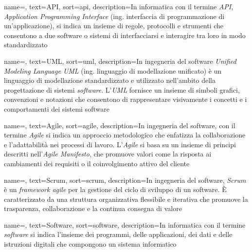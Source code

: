 

 {
    name=,
    text=API,
    sort=api,
    description={In informatica con il termine \emph{API}, \emph{Application Programming Interface} (ing. interfaccia di programmazione di un'applicazione), si indica
    un insieme di regole, protocolli e strumenti che consentono a due software o sistemi di interfacciarsi e interagire tra loro in modo standardizzato}
}

 {
    name=,
    text=UML,
    sort=uml,
    description={In ingegneria del software \emph{Unified Modeling Language UML} (ing. linguaggio di modellazione unificato) è un linguaggio di 
    modellazione standardizzato e utilizzato nell'ambito della progettazione di sistemi \emph{software}. L'\emph{UML} fornisce un insieme di simboli grafici, convenzioni e notazioni che consentono di rappresentare
    visivamente i concetti e i comportamenti dei sistemi software}
}

 {
    name=,
    text=Agile,
    sort=agile,
    description={In ingegneria del software, con il termine \emph{Agile} si indica un approccio metodologico che enfatizza la collaborazione e l'adattabilità nei processi di lavoro.
    L'\emph{Agile} si basa su un insieme di principi descritti nell'\emph{Agile Manifesto}, che promuove valori come la risposta ai cambiamenti dei requisiti o il coinvolgimento attivo del cliente}
}

 {
    name=,
    text=Scrum,
    sort=scrum,
    description={In ingegneria del software, \emph{Scrum} è un \emph{framework agile} per la gestione del ciclo di sviluppo di un software. È caratterizzato da una struttura organizzativa flessibile e iterativa che promuove la trasparenza, collaborazione e la continua consegna di valore}
}

 {
    name=,
    text=Software,
    sort=software,
    description={In informatica con il termine \emph{software} si indica l'insieme dei programmi, delle applicazioni, dei dati e delle istruzioni digitali che compongono un sistema informatico}
}


